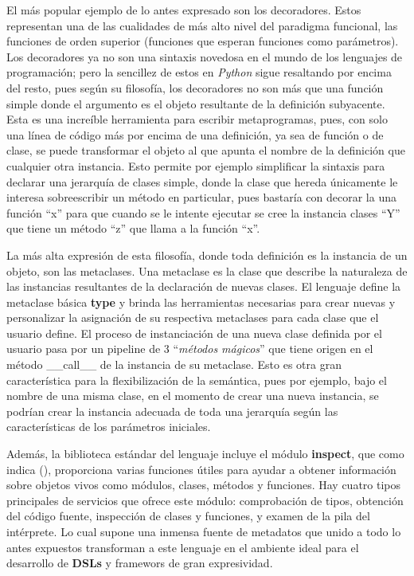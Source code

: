 El más popular ejemplo de lo antes expresado son los decoradores. Estos representan una de las
cualidades de más alto nivel del paradigma funcional, las funciones de orden superior (funciones
que esperan funciones como parámetros). Los decoradores ya no son una sintaxis novedosa en el
mundo de los lenguajes de programación; pero la sencillez de estos en {\it Python} sigue resaltando
por encima del resto, pues según su filosofía, los decoradores no son más que una función
simple donde el argumento es el objeto resultante de la definición subyacente. Esta es una
increíble herramienta para escribir metaprogramas, pues, con solo una línea de código más por
encima de una definición, ya sea de función o de clase, se puede transformar el objeto al que
apunta el nombre de la definición que cualquier otra instancia. Esto permite por ejemplo
simplificar la sintaxis para declarar una jerarquía de clases simple, donde la clase que hereda
únicamente le interesa sobreescribir un método en particular, pues bastaría con decorar la
una función ``x'' para que cuando se le intente ejecutar se cree la instancia clases ``Y''
que tiene un método ``z'' que llama a la función ``x''.

La más alta expresión de esta filosofía, donde toda definición es la instancia de un objeto,
son las metaclases. Una metaclase es la clase que describe la naturaleza de las instancias
resultantes de la declaración de nuevas clases. El lenguaje define la metaclase básica
{\bf type} y brinda las herramientas necesarias para crear nuevas y personalizar la asignación
de su respectiva metaclases para cada clase que el usuario define. El proceso de instanciación
de una nueva clase definida por el usuario pasa por un pipeline de 3 ``{\it métodos mágicos}'' que
tiene origen en el método \_\_call\_\_ de la instancia de su metaclase. Esto es otra gran
característica para la flexibilización de la semántica, pues por ejemplo, bajo el nombre de una
misma clase, en el momento de crear una nueva instancia, se podrían crear la instancia adecuada
de toda una jerarquía según las características de los parámetros iniciales.

Además, la biblioteca estándar del lenguaje incluye el módulo {\bf inspect}, que como indica (\cite{python}),
proporciona varias funciones útiles para ayudar a obtener información sobre objetos vivos
como módulos, clases, métodos y funciones. Hay cuatro tipos principales de servicios que ofrece
este módulo: comprobación de tipos, obtención del código fuente, inspección de clases y funciones,
y examen de la pila del intérprete. Lo cual supone una inmensa fuente de metadatos que unido
a todo lo antes expuestos transforman a este lenguaje en el ambiente ideal para el desarrollo de
    {\bf DSLs} y framewors de gran expresividad.

